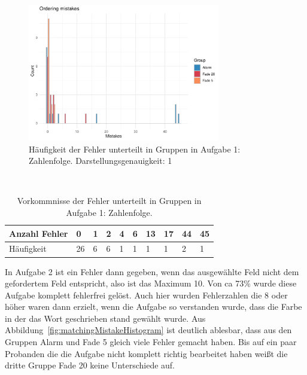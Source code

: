 
\begin{figure}[H]
	\centering
	\includegraphics[width=0.75\textwidth]{./_StudyResults/orderingMisHist}
	\caption{Häufigkeit der Fehler unterteilt in Gruppen in Aufgabe 1: Zahlenfolge. Darstellungsgenauigkeit: 1}
	\label{fig:orderingMistakeHistogram}
\end{figure}

\begin{table}
	\caption{Vorkommnisse der Fehler unterteilt in Gruppen in Aufgabe 1: Zahlenfolge.}~\label{tab:orderingMistakeNumbers}
	
	\setlength\tabcolsep{3pt}
	\renewcommand{\arraystretch}{1.4}%
	\begin{tabularx}{\textwidth}{ | l | x | x | x | x | x | x | x | x | x | }
		\hline
		Anzahl Fehler & 0   & 1  & 2  & 4  & 6  & 13 & 17 & 44  & 45 \\ \hline\hline
		Häufigkeit 	  & 26  & 6  & 6  & 1  & 1  & 1  & 1  &  2  & 1  \\ \hline
	\end{tabularx}
\end{table}

In Aufgabe 2 ist ein Fehler dann gegeben, wenn das ausgewählte Feld nicht dem gefordertem Feld entspricht, also ist das Maximum 10.
Von ca 73\% wurde diese Aufgabe komplett fehlerfrei gelöst.
Auch hier wurden Fehlerzahlen die 8 oder höher waren dann erzielt, wenn die Aufgabe so verstanden wurde, dass die Farbe in der das Wort geschrieben stand gewählt wurde.
Aus Abbildung~\ref{fig:matchingMistakeHistogram} ist deutlich ablesbar, dass aus den Gruppen Alarm und Fade 5 gleich viele Fehler gemacht haben. Bis auf ein paar Probanden die die Aufgabe nicht komplett richtig bearbeitet haben weißt die dritte Gruppe Fade 20 keine Unterschiede auf.


